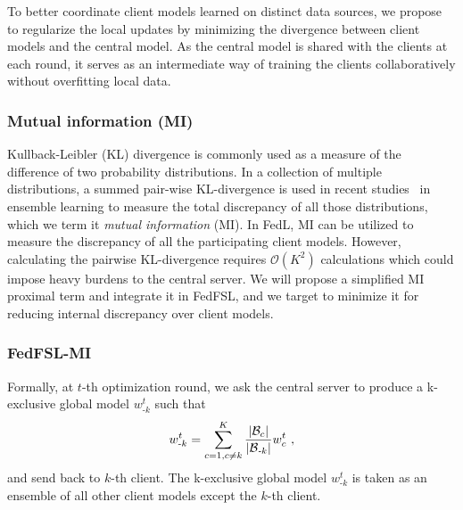To better coordinate client models learned on distinct data sources,  we propose to regularize the local updates by minimizing the divergence between client models and the central model.
As the central model is shared with the clients at each round, it serves as an intermediate way of training the clients collaboratively without overfitting local data. 

\subsubsection{Mutual information (MI)}
Kullback-Leibler (KL) divergence is commonly used as a measure of the difference of two probability distributions. 
In a collection of multiple distributions, a summed pair-wise KL-divergence is used in
recent studies~\cite{belghazi2018mutual, zhang2018mutual} in ensemble learning to measure the total discrepancy of all those distributions, which we term it \textit{mutual information} (MI). 
In FedL, MI can be utilized to measure the discrepancy of all the participating client models. However, calculating the pairwise KL-divergence requires $\mathcal{O}(K^2)$ calculations which could impose heavy burdens to the central server.
We will propose a simplified MI proximal term and integrate it in FedFSL, and we target to minimize it for reducing internal discrepancy over client models. 


\subsubsection{FedFSL-MI}
Formally, at $t$-th optimization round, we ask the central server to produce a k-exclusive global model $w^t_{\text{-}k}$ such that
\begin{equation}
\label{eq:fuse_mi}
w^{t}_{\text{-}k} =  \sum_{c=1,c\neq k}^K \frac{|\mathcal{B}_c|}{|\mathcal{B}_{\textit{-}k}|} \wsupsubeq{t}{c} \ ,
\end{equation} 
and send back to $k$-th client. The k-exclusive global model $w^{t}_{\text{-}k}$ is taken as an ensemble of all other client models except the $k$-th client. 


